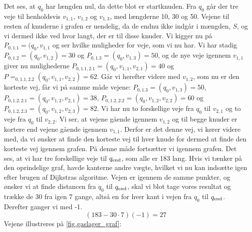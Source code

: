  


Det ses, at $q_0$ har længden nul, da dette blot er startknuden. Fra $q_0$ går der tre veje til henholdsvis $v_{1,1}$, $v_{1,2}$ og $v_{1,3}$, med længderne 10, 30 og 50. Vejene til resten af knuderne i grafen er uendelig, da de endnu ikke indgår i mængden, $S$, og vi dermed ikke ved hvor langt, der er til disse knuder. Vi kigger nu på $P_{0,1.1}=(q_0, v_{1,1}$ og ser hvilke muligheder for veje, som vi nu har. Vi har stadig $P_{0,1.2}=(q_{0},v_{1,2})=30$ og $P_{0,1.3}=(q_{0},v_{1,3})=50$, og de nye veje igennem $v_{1,1}$ giver nu mulighederne $P_{0,1.1,2.1}=(q_{0},v_{1,1},v_{2,1})=40$ og $P=_{0,1.1,2.2}(q_{0},v_{1,1},v_{2,2})=62$. Går vi herefter videre med $v_{1,2}$, som nu er den korteste vej, får vi på samme måde vejene: $P_{0,1.3}=(q_{0},v_{1,3})=50$, $P_{0,1.2,2.1}=(q_{0},v_{1,2},v_{2,1})=38$, $P_{0,1.2,2.2}=(q_{0},v_{1,2},v_{2,2})=60$ og $P_{0,1.2,2.3}=(q_{0},v_{1,2},v_{2,3})=82$. Vi har nu to forskellige veje fra $q_{0}$ til $v_{2,1}$ og to veje fra $q_{0}$ til $v_{2,2}$. Vi ser, at vejene gående igennem $v_{1,2}$ og til begge knuder er kortere end vejene gående igennem $v_{1,1}$. Derfor er det denne vej, vi kører videre med, da vi ønsker at finde den korteste vej til hver knude for dermed at finde den korteste vej igennem grafen. På denne måde fortsætter vi igennem grafen. Det ses, at vi har tre forskellige veje til $q_{\textrm{end}}$, som alle er 183 lang. Hvis vi tænker på den oprindelige graf, havde kanterne andre vægte, hvilket vi nu kan indsætte igen efter brugen af Dijkstras algoritme. Vejen er igennem de samme punkter, og ønsker vi at finde distancen fra $q_{0}$ til $q_{\textrm{end}}$, skal vi blot tage vores resultat og trække de 30 fra igen 7 gange, altså en for hver kant i vejen fra $q_{0}$ til $q_{\textrm{end}}$. Derefter ganger vi med -1.
\begin{equation}
(183-30 \cdot 7) (-1) = 27
\end{equation}
Vejene illustreres på \autoref{fig.gaslager_graf}:





